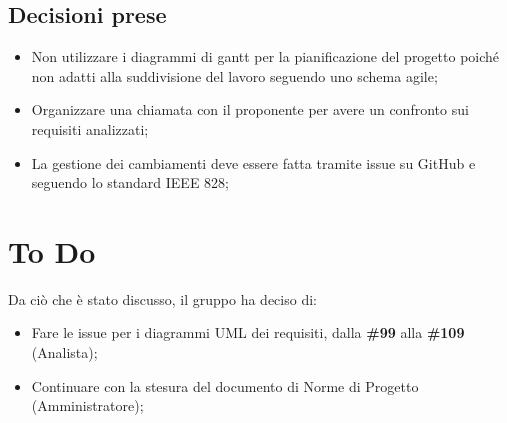 \documentclass[a4paper, 12pt]{article}
\begin{document}
\subsection{Decisioni prese}
\begin{itemize}
    \item Non utilizzare i diagrammi di gantt per la pianificazione del progetto poiché non adatti alla suddivisione del lavoro seguendo uno schema agile;
    \item Organizzare una chiamata con il proponente per avere un confronto sui requisiti analizzati;
    \item La gestione dei cambiamenti deve essere fatta tramite issue su GitHub e seguendo lo standard IEEE 828;
\end{itemize}

\section{To Do}
Da ciò che è stato discusso, il gruppo ha deciso di:
\begin{itemize}
    \item Fare le issue per i diagrammi UML dei requisiti, dalla \textbf{\#99} alla \textbf{\#109} (Analista);
    \item Continuare con la stesura del documento di Norme di Progetto (Amministratore);
\end{itemize}
\end{document}
